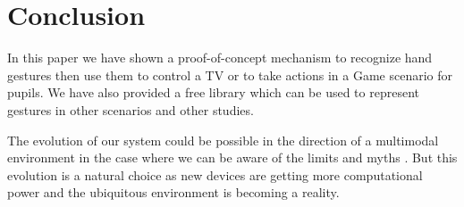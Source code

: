 \documentclass{llncs}
\begin{document}
\section*{Conclusion}
In this paper we have shown a proof-of-concept mechanism to recognize hand
gestures then use them to control a TV or to take actions in a Game scenario
for pupils.
We have also provided a free library which can be used to represent gestures
in other scenarios and other studies.

The evolution of our system could be possible in the direction of a multimodal
environment in the case where we can be aware of the limits and myths
\cite{Oviatt99tenmyths}.
But this evolution is a natural choice as new devices are getting more
computational power and the ubiquitous environment is becoming a reality.



\end{document}
